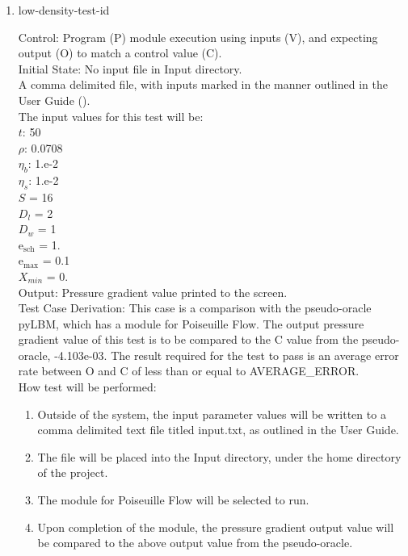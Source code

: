 \documentclass[12pt, titlepage]{article}
\newcounter{testcounter} %
\begin{document}
\begin{enumerate}
\item{low-density-test-id\thetestcounter \\}

Control: Program (P) module execution using inputs (V), and expecting output (O) to match a control value (C).\\
					
Initial State: No input file in Input directory.\\
					
A comma delimited file, with inputs marked in the manner outlined in the User Guide (\citet{LBM_UserGuide_PM}).\\The input values for this test will be:\\
$t$: 50\\
$\rho$: 0.0708\\
$\eta_b$: 1.e-2\\
$\eta_s$: 1.e-2\\
$S$ = 16\\
$D_{l}$ = 2\\
$D_{w}$ = 1\\
$\mathrm{e_{sch}}$ = 1.\\
$\mathrm{e_{max}}$ = 0.1\\
$X_{min}$ = 0.\\

					
Output: Pressure gradient value printed to the screen. \\ 

Test Case Derivation: This case is a comparison with the pseudo-oracle pyLBM, which has a module for Poiseuille Flow. The output pressure gradient value of this test is to be compared to the C value from the pseudo-oracle, -4.103e-03. The result required for the test to pass is an average error rate between O and C of less than or equal to AVERAGE\_ERROR.\\

					
How test will be performed: 

\begin{enumerate}
\item Outside of the system, the input parameter values will be written to a comma delimited text file titled input.txt, as outlined in the User Guide.
\item The file will be placed into the Input directory, under the home directory of the project.
\item The module for Poiseuille Flow will be selected to run.
\item Upon completion of the module, the pressure gradient output value will be compared to the above output value from the pseudo-oracle.
\end{enumerate}	


\end{enumerate}
\end{document}
